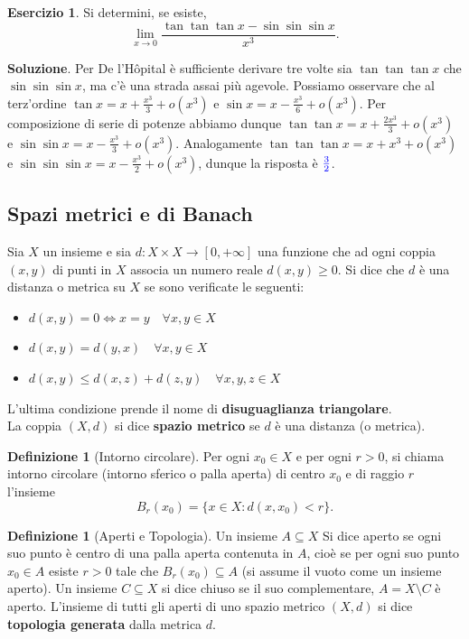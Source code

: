 \documentclass[a4paper,twoside]{article}
\theoremstyle{definition}
\newtheorem{definizione}[theorem]{Definizione}
\newtheorem{ex}[theorem]{Esercizio}
\numberwithin{theorem}{section}
\begin{document}
\begin{ex} Si determini, se esiste, 
$$ \lim_{x\to 0}\frac{\tan\tan\tan x-\sin\sin\sin x}{x^3}. $$ 
\end{ex}
\textbf{Soluzione}. Per De l'H\^opital è sufficiente derivare tre volte sia $\tan\tan\tan x$ che $\sin\sin\sin x$, ma c'è una strada assai più agevole. Possiamo osservare che al terz'ordine $\tan x = x+\frac{x^3}{3}+o(x^3)$ e $\sin x=x-\frac{x^3}{6}+o(x^3)$. Per composizione di serie di potenze abbiamo dunque $\tan\tan x=x+\frac{2x^3}{3}+o(x^3)$ e $\sin\sin x=x-\frac{x^3}{3}+o(x^3)$. Analogamente $\tan\tan\tan x=x+x^3+o(x^3)$ e $\sin\sin\sin x=x-\frac{x^3}{2}+o(x^3)$, dunque la risposta è $\color{blue}\frac{3}{2}$.

\subsection{Spazi metrici e di Banach}
Sia $X$ un insieme e sia $d:X \times X\to [0,+\infty]$ una funzione che ad ogni coppia $(x,y)$ di punti in $X$ associa un numero reale $d(x,y)\geq0$. Si dice che $d$ è una distanza o metrica su $X$ se sono verificate le seguenti:
\begin{itemize}
\item  $d(x,y)=0 \Leftrightarrow x=y\quad\forall x,y\in X$
\item $d(x,y)=d(y,x)\quad\forall x,y\in X$
\item $d(x,y)\leq d(x,z)+d(z,y)\quad\forall x,y,z\in X$
\end{itemize}
L'ultima condizione prende il nome di \textbf{disuguaglianza triangolare}.\\
La coppia $(X,d)$ si dice \textbf{spazio metrico} se $d$ è una distanza (o metrica).

\begin{definizione}[Intorno circolare]
Per ogni $x_0\in X$ e per ogni $r>0$, si chiama intorno circolare (intorno sferico o palla aperta) di centro $x_0$ e di raggio $r$ l'insieme $$B_r(x_0)=\{x\in X: d(x,x_0)<r\}.$$
\end{definizione}

\begin{definizione}[Aperti e Topologia]
Un insieme $A\subseteq X$ Si dice aperto se ogni suo punto è centro di una palla aperta contenuta in $A$, cioè se per ogni suo punto $x_0\in A$ esiste $r>0$ tale che $B_r(x_0)\subseteq A$ (si assume il vuoto come un insieme aperto). Un insieme $C\subseteq X$ si dice chiuso se il suo complementare, $A=X\setminus C$ è aperto. L'insieme di tutti gli aperti di uno spazio metrico $(X,d)$ si dice \textbf{topologia generata} dalla metrica $d$.
\end{definizione}
\end{document}
